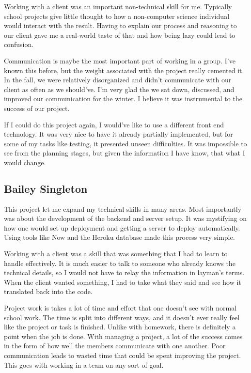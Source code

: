 \documentclass[draftclsnofoot,onecolumn,journal,letterpaper,compsoc,10pt]{IEEEtran}
\begin{document}
Working with a client was an important non-technical skill for me. Typically school projects give little thought to how a non-computer science individual would interact with the result. Having to explain our process and reasoning to our client gave me a real-world taste of that and how being lazy could lead to confusion.

Communication is maybe the most important part of working in a group. I've known this before, but the weight associated with the project really cemented it. In the fall, we were relatively disorganized and didn't communicate with our client as often as we should've. I'm very glad the we sat down, discussed, and improved our communication for the winter. I believe it was instrumental to the success of our project.

If I could do this project again, I would've like to use a different front end technology. It was very nice to have it already partially implemented, but for some of my tasks like testing, it presented unseen difficulties. It was impossible to see from the planning stages, but given the information I have know, that what I would change.
\subsection{Bailey Singleton}
This project let me expand my technical skills in many areas. Most importantly was about the development of the backend and server setup. It was mystifying on how one would set up deployment and getting a server to deploy automatically. Using tools like Now and the Heroku database made this process very simple. 

Working with a client was a skill that was something that I had to learn to handle effectively. It is much easier to talk to someone who already knows the technical details, so I would not have to relay the information in layman's terms. When the client wanted something, I had to take what they said and see how it translated back into the code. 

Project work is takes a lot of time and effort that one doesn't see with normal school work. The time is split into different ways, and it doesn't ever really feel like the project or task is finished. Unlike with homework, there is definitely a point when the job is done. With managing a project, a lot of the success comes in the form of how well the members communicate with one another. Poor communication leads to wasted time that could be spent improving the project. This goes with working in a team on any sort of goal.
\end{document}

